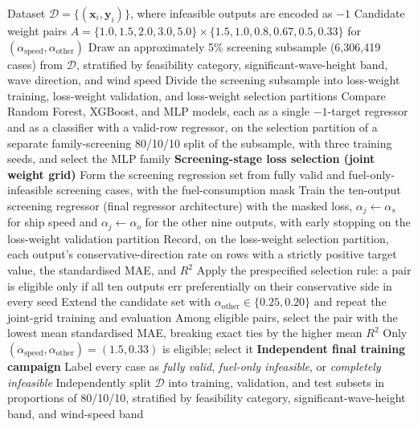 \documentclass[final,5p,times,twocolumn,numbers]{elsarticle}
\begin{document}
\begin{algorithm}[ht!]
\scriptsize
\caption{Construction of the two-stage S175 surrogate}
\label{alg:surrogate}
\begin{algorithmic}[1]
\Require Dataset $\mathcal{D}=\{(\mathbf{x}_i,\mathbf{y}_i)\}$, where infeasible outputs are encoded as $-1$
\Require Candidate weight pairs $A=\{1.0,1.5,2.0,3.0,5.0\}\times\{1.5,1.0,0.8,0.67,0.5,0.33\}$ for $(\alpha_{\mathrm{speed}},\alpha_{\mathrm{other}})$
\State Draw an approximately 5\% screening subsample (6{,}306{,}419 cases) from $\mathcal{D}$, stratified by feasibility category, significant-wave-height band, wave direction, and wind speed
\State Divide the screening subsample into loss-weight training, loss-weight validation, and loss-weight selection partitions
\State Compare Random Forest, XGBoost, and MLP models, each as a single $-1$-target regressor and as a classifier with a valid-row regressor, on the selection partition of a separate family-screening 80/10/10 split of the subsample, with three training seeds, and select the MLP family
\Statex \textbf{Screening-stage loss selection (joint weight grid)}
\State Form the screening regression set from fully valid and fuel-only-infeasible screening cases, with the fuel-consumption mask
\State Train the ten-output screening regressor (final regressor architecture) with the masked loss, $\alpha_j\gets\alpha_s$ for ship speed and $\alpha_j\gets\alpha_o$ for the other nine outputs, with early stopping on the loss-weight validation partition
\State Record, on the loss-weight selection partition, each output's conservative-direction rate on rows with a strictly positive target value, the standardised MAE, and $R^2$
\EndFor
\State Apply the prespecified selection rule: a pair is eligible only if all ten outputs err preferentially on their conservative side in every seed
\State Extend the candidate set with $\alpha_{\mathrm{other}}\in\{0.25,0.20\}$ and repeat the joint-grid training and evaluation 
\EndIf
\State Among eligible pairs, select the pair with the lowest mean standardised MAE, breaking exact ties by the higher mean $R^2$
\State Only $(\alpha_{\mathrm{speed}},\alpha_{\mathrm{other}})=(1.5,0.33)$ is eligible; select it
\Statex \textbf{Independent final training campaign}
\State Label every case as \emph{fully valid}, \emph{fuel-only infeasible}, or \emph{completely infeasible}
\State Independently split $\mathcal{D}$ into training, validation, and test subsets in proportions of 80/10/10, stratified by feasibility category, significant-wave-height band, and wind-speed band

\end{algorithmic}
\end{algorithm}
\end{document}
